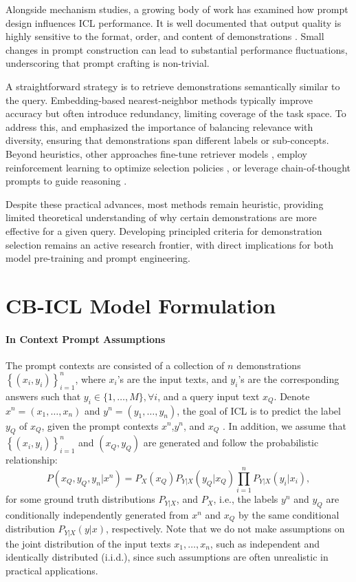 \documentclass{article} %
\theoremstyle{plain} %
\begin{document}
Alongside mechanism studies, a growing body of work has examined how prompt design influences ICL performance. It is well documented that output quality is highly sensitive to the format, order, and content of demonstrations \citep{wang2023large,liu2024let}. Small changes in prompt construction can lead to substantial performance fluctuations, underscoring that prompt crafting is non-trivial.

A straightforward strategy is to retrieve demonstrations semantically similar to the query. Embedding-based nearest-neighbor methods \citep{su2022selective, qin2023context,li2023finding} typically improve accuracy but often introduce redundancy, limiting coverage of the task space. To address this, \citet{su2022selective} and \citet{wang2023large} emphasized the importance of balancing relevance with diversity, ensuring that demonstrations span different labels or sub-concepts. Beyond heuristics, other approaches fine-tune retriever models \citep{rubin2021learning, mavromatis2023examples}, employ reinforcement learning to optimize selection policies \citep{zhang2022active}, or leverage chain-of-thought prompts to guide reasoning \citep{wei2022chain}.

Despite these practical advances, most methods remain heuristic, providing limited theoretical understanding of why certain demonstrations are more effective for a given query. Developing principled criteria for demonstration selection remains an active research frontier, with direct implications for both model pre-training and prompt engineering.

\section{CB-ICL Model Formulation}
\label{CB-ICL}

\paragraph{In Context Prompt Assumptions} 
The prompt contexts are consisted of a collection of $n$ demonstrations $\left\{(x_i,y_i)\right\}_{i=1}^{n}$, where $x_i$’s are the input texts, and $y_i$’s are the corresponding answers such that $y_i \in \{1, \ldots, M\}, \forall i$, and a query input text $x_Q$. Denote $x^n=(x_1,\dots,x_n)$ and $y^n=(y_1,\dots,y_n)$, the goal of ICL is to predict the label $y_Q$ of $x_Q$, given the prompt contexts $x^n$,$y^n$, and $x_Q$ \citep{yang2024context}.  In addition, we assume that $\left\{(x_i,y_i)\right\}_{i=1}^{n}$ and $(x_Q,y_Q)$ are generated and follow the probabilistic relationship:
\begin{equation*}
    P(x_Q,y_Q,y_n|x^n) = P_{X}(x_Q)P_{Y|X}(y_Q|x_Q) \prod_{i=1}^n P_{Y|X}(y_i|x_i),
\end{equation*}
for some ground truth distributions $P_{Y|X}$, and $P_X$, i.e., the labels $y^n$ and $y_Q$ are conditionally independently generated from $x^n$ and $x_Q$ by the same conditional distribution $P_{Y|X}(y|x)$, respectively. Note that we do not make assumptions on the joint distribution of the input texts $x_1,\dots,x_n$, such as independent and identically distributed (i.i.d.), since such assumptions are often unrealistic in practical applications.
\end{document}
